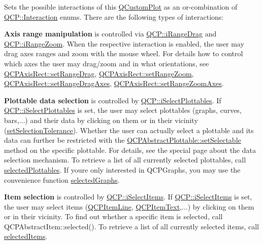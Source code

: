 Sets the possible interactions of this \hyperlink{classQCustomPlot}{Q\+Custom\+Plot} as an or-\/combination of \hyperlink{namespaceQCP_a2ad6bb6281c7c2d593d4277b44c2b037}{Q\+C\+P\+::\+Interaction} enums. There are the following types of interactions\+:

{\bfseries Axis range manipulation} is controlled via \hyperlink{namespaceQCP_a2ad6bb6281c7c2d593d4277b44c2b037a2c4432b9aceafb94000be8d1b589ef18}{Q\+C\+P\+::i\+Range\+Drag} and \hyperlink{namespaceQCP_a2ad6bb6281c7c2d593d4277b44c2b037abee1e94353525a636aeaf0ba32b72e14}{Q\+C\+P\+::i\+Range\+Zoom}. When the respective interaction is enabled, the user may drag axes ranges and zoom with the mouse wheel. For details how to control which axes the user may drag/zoom and in what orientations, see \hyperlink{classQCPAxisRect_ae6aef2f7211ba6097c925dcd26008418}{Q\+C\+P\+Axis\+Rect\+::set\+Range\+Drag}, \hyperlink{classQCPAxisRect_a7960a9d222f1c31d558b064b60f86a31}{Q\+C\+P\+Axis\+Rect\+::set\+Range\+Zoom}, \hyperlink{classQCPAxisRect_a648cce336bd99daac4a5ca3e5743775d}{Q\+C\+P\+Axis\+Rect\+::set\+Range\+Drag\+Axes}, \hyperlink{classQCPAxisRect_a9442cca2aa358405f39a64d51eca13d2}{Q\+C\+P\+Axis\+Rect\+::set\+Range\+Zoom\+Axes}.

{\bfseries Plottable data selection} is controlled by \hyperlink{namespaceQCP_a2ad6bb6281c7c2d593d4277b44c2b037a67148c8227b4155eca49135fc274c7ec}{Q\+C\+P\+::i\+Select\+Plottables}. If \hyperlink{namespaceQCP_a2ad6bb6281c7c2d593d4277b44c2b037a67148c8227b4155eca49135fc274c7ec}{Q\+C\+P\+::i\+Select\+Plottables} is set, the user may select plottables (graphs, curves, bars,...) and their data by clicking on them or in their vicinity (\hyperlink{classQCustomPlot_a4dc31241d7b09680950e19e5f971ed93}{set\+Selection\+Tolerance}). Whether the user can actually select a plottable and its data can further be restricted with the \hyperlink{classQCPAbstractPlottable_ac238d6e910f976f1f30d41c2bca44ac3}{Q\+C\+P\+Abstract\+Plottable\+::set\+Selectable} method on the specific plottable. For details, see the special page about the data selection mechanism. To retrieve a list of all currently selected plottables, call \hyperlink{classQCustomPlot_a747faaab57c56891e901a1e97fa4359a}{selected\+Plottables}. If you\textquotesingle{}re only interested in Q\+C\+P\+Graphs, you may use the convenience function \hyperlink{classQCustomPlot_ad3547aded026d8a9ae6ef13a69080d06}{selected\+Graphs}.

{\bfseries Item selection} is controlled by \hyperlink{namespaceQCP_a2ad6bb6281c7c2d593d4277b44c2b037aea2f7c105d674e76d9b187b02ef29260}{Q\+C\+P\+::i\+Select\+Items}. If \hyperlink{namespaceQCP_a2ad6bb6281c7c2d593d4277b44c2b037aea2f7c105d674e76d9b187b02ef29260}{Q\+C\+P\+::i\+Select\+Items} is set, the user may select items (\hyperlink{classQCPItemLine}{Q\+C\+P\+Item\+Line}, \hyperlink{classQCPItemText}{Q\+C\+P\+Item\+Text},...) by clicking on them or in their vicinity. To find out whether a specific item is selected, call Q\+C\+P\+Abstract\+Item\+::selected(). To retrieve a list of all currently selected items, call \hyperlink{classQCustomPlot_afda487bcf2d6cf1a57173d82495e29ba}{selected\+Items}.

